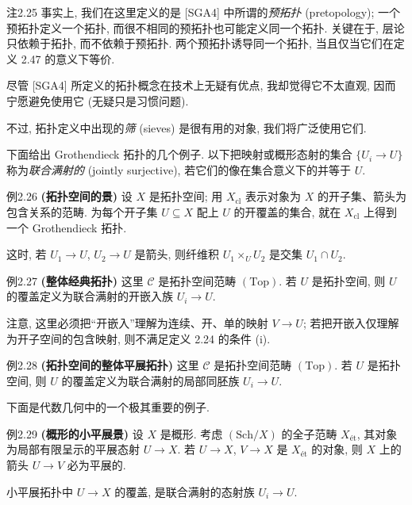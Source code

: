 \begin{origstatement}{注}{2.25}\label{ch02:rem225}
事实上, 我们在这里定义的是 [SGA4] 中所谓的\emph{预拓扑} (pretopology); 一个预拓扑定义一个拓扑, 而很不相同的预拓扑也可能定义同一个拓扑. 关键在于, 层论只依赖于拓扑, 而不依赖于预拓扑. 两个预拓扑诱导同一个拓扑, 当且仅当它们在定义 2.47 的意义下等价.

尽管 [SGA4] 所定义的拓扑概念在技术上无疑有优点, 我却觉得它不太直观, 因而宁愿避免使用它 (无疑只是习惯问题).

不过, 拓扑定义中出现的\emph{筛} (sieves) 是很有用的对象, 我们将广泛使用它们.
\end{origstatement}

下面给出 Grothendieck 拓扑的几个例子. 以下把映射或概形态射的集合 $\{U_i\to U\}$ 称为\emph{联合满射的} (jointly surjective), 若它们的像在集合意义下的并等于 $U$.

\begin{origstatement}{例}{2.26}\label{ch02:ex226}
\textbf{(拓扑空间的景)} 设 $X$ 是拓扑空间; 用 $X_{\mathrm{cl}}$ 表示对象为 $X$ 的开子集、箭头为包含关系的范畴. 为每个开子集 $U\subseteq X$ 配上 $U$ 的开覆盖的集合, 就在 $X_{\mathrm{cl}}$ 上得到一个 Grothendieck 拓扑.

这时, 若 $U_1\to U$, $U_2\to U$ 是箭头, 则纤维积 $U_1\times_UU_2$ 是交集 $U_1\cap U_2$.
\end{origstatement}

\begin{origstatement}{例}{2.27}\label{ch02:ex227}
\textbf{(整体经典拓扑)} 这里 $\mathcal C$ 是拓扑空间范畴 $(\mathrm{Top})$. 若 $U$ 是拓扑空间, 则 $U$ 的覆盖定义为联合满射的开嵌入族 $U_i\to U$.

注意, 这里必须把“开嵌入”理解为连续、开、单的映射 $V\to U$; 若把开嵌入仅理解为开子空间的包含映射, 则不满足定义 2.24 的条件 (i).
\end{origstatement}

\begin{origstatement}{例}{2.28}\label{ch02:ex228}
\textbf{(拓扑空间的整体平展拓扑)} 这里 $\mathcal C$ 是拓扑空间范畴 $(\mathrm{Top})$. 若 $U$ 是拓扑空间, 则 $U$ 的覆盖定义为联合满射的局部同胚族 $U_i\to U$.
\end{origstatement}

下面是代数几何中的一个极其重要的例子.

\begin{origstatement}{例}{2.29}\label{ch02:ex229}
\textbf{(概形的小平展景)} 设 $X$ 是概形. 考虑 $(\mathrm{Sch}/X)$ 的全子范畴 $X_{\text{ét}}$, 其对象为局部有限呈示的平展态射 $U\to X$. 若 $U\to X$, $V\to X$ 是 $X_{\text{ét}}$ 的对象, 则 $X$ 上的箭头 $U\to V$ 必为平展的.

小平展拓扑中 $U\to X$ 的覆盖, 是联合满射的态射族 $U_i\to U$.
\end{origstatement}

